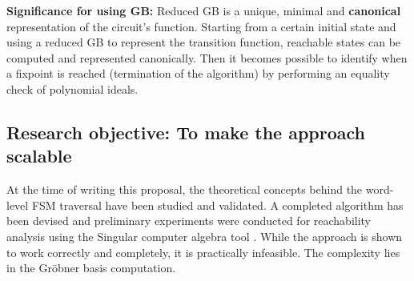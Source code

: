 \begin{example}
% 
\end{example}

{\bf Significance for using GB:} Reduced GB is a unique, minimal and
{\bf canonical} representation of the circuit's function. Starting
from a certain initial state and using a reduced GB to represent the
transition function, reachable states can be computed and represented
canonically. Then it becomes possible to identify  when a fixpoint
is reached (termination of the algorithm) by performing an equality
check of polynomial ideals. 

\subsection{Research objective: To make the approach scalable}

At the time of writing this proposal, the theoretical concepts behind
the word-level FSM traversal have been studied and validated. A
completed algorithm has been devised and preliminary experiments were
conducted for reachability analysis using the {\sc Singular} computer
algebra tool \cite{DGPS}. While the approach is shown to work
correctly and completely, it is practically infeasible. The complexity
lies in the Gr\"obner basis computation. 

